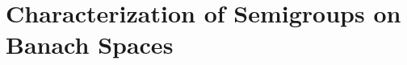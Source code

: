 \setcounter{chapter}{1}
\chapter{Characterization of Semigroups on Banach Spaces}\label{chap:a2}



%
%
